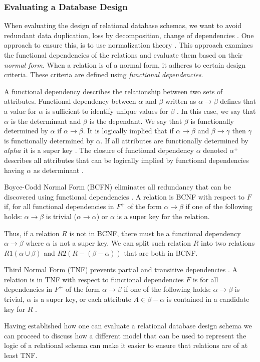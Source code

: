 \subsubsection*{Evaluating a Database Design}
When evaluating the design of relational database schemas, we want to avoid redundant data duplication, loss by decomposition, change of dependencies \cite{DBSBook}.
One approach to ensure this, is to use normalization theory \cite{DBSBook}. This approach examines the functional dependencies of the relations and evaluate them based on their \textit{normal form}.
When a relation is of a normal form, it adheres to certain design criteria. These criteria are defined using \textit{functional dependencies}.

A functional dependency describes the relationship between two sets of attributes. 
Functional dependency between $\alpha$ and $\beta$ written as $\alpha \rightarrow \beta$ defines that a value for $\alpha$ is sufficient to identify unique values for $\beta$ \cite{DBSBook}.
In this case, we say that $\alpha$ is the determinant and $\beta$ is the dependant. 
We say that $\beta$ is functionally determined by $\alpha$ if $\alpha \rightarrow \beta$.
It is logically implied that if $\alpha \rightarrow \beta$ and $\beta \rightarrow \gamma$ then $\gamma$ is functionally determined by $\alpha$.
If all attributes are functionally determined by $alpha$ it is a super key \cite{DBSBook}.
The closure of functional dependency $\alpha$ denoted $\alpha^+$ describes all attributes that can be logically implied by functional dependencies having $\alpha$ as determinant \cite{DBSBook}. 

Boyce-Codd Normal Form (BCFN) eliminates all redundancy that can be discovered using functional dependencies \cite{DBSBook}. 
A relation is BCNF with respect to $F$ if, for all functional dependencies in $F^+$ of the form $\alpha \rightarrow \beta$ if one of the following holds:
$\alpha \rightarrow \beta$ is trivial ($\alpha \rightarrow \alpha$) or $\alpha$ is a super key for the relation.

Thus, if a relation $R$ is not in BCNF, there must be a functional dependency $\alpha \rightarrow \beta$ where $\alpha$ is not a super key. 
We can split such relation $R$ into two relations $R1(\alpha \cup \beta)$ and $R2(R-(\beta-\alpha))$ that are both in BCNF.

Third Normal Form (TNF) prevents partial and transitive dependencies \cite{MontayaNormalForms}.
A relation is in TNF with respect to functional dependencies $F$ is for all dependencies in $F^+$ of the form $\alpha \rightarrow \beta$ if one of the following holds: 
$\alpha \rightarrow \beta$ is trivial, $\alpha$ is a super key, or each attribute $A \in \beta-\alpha$ is contained in a candidate key for $R$ \cite{DBSBook}.

Having established how one can evaluate a relational database design schema we can proceed to discuss how a different model that can be used to represent the logic of a relational schema can make it easier to ensure that relations are of at least TNF.


